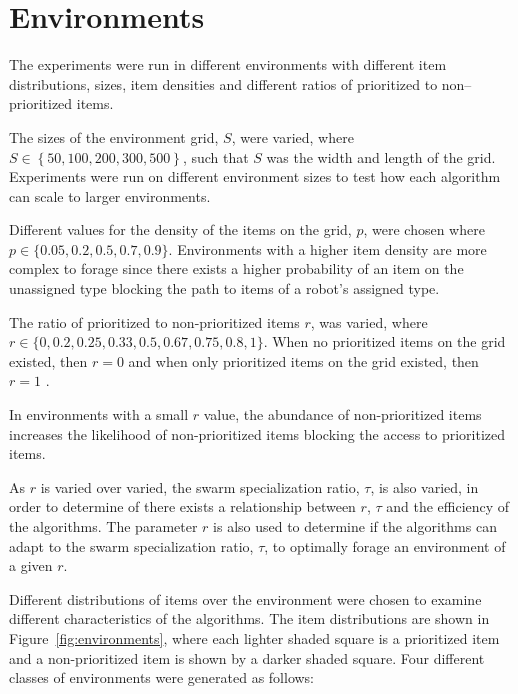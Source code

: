 \section{Environments}
\label{experimentenvironments}

The experiments were run in different environments with different item distributions, sizes, item densities and different ratios of prioritized to non--prioritized items. 

The sizes of the environment grid, $S$, were varied, where $S\in \left\{ 50, 100, 200, 300, 500\right\}$, such that $S$ was the width and length of the grid.  Experiments were run on different environment sizes to test how each algorithm can scale to larger environments.

Different values for the density of the items on the grid, $p$, were chosen where $p\in \{ 0.05,\allowbreak 0.2,\allowbreak 0.5,\allowbreak 0.7,\allowbreak 0.9\}$. Environments with a higher item density are more complex to forage since there exists a higher probability of an item on the unassigned type blocking the path to items of a robot's assigned type.

The ratio of prioritized to non-prioritized items $r$, was varied, where $r\in \{0,\allowbreak 0.2,\allowbreak 0.25,\allowbreak 0.33,\allowbreak 0.5,\allowbreak 0.67,\allowbreak 0.75,\allowbreak 0.8, 1\}$. When no prioritized items on the grid existed, then $r=0$ and when only prioritized items on the grid existed, then $r=1$ .

In environments with a small $r$ value, the abundance of non-prioritized items increases the likelihood of non-prioritized items blocking the access to prioritized items. 

As $r$ is varied over varied, the swarm specialization ratio, $\tau$, is also varied, in order to determine of there exists a relationship between $r$, $\tau$ and the efficiency of the algorithms. The parameter $r$ is also used to determine if the algorithms can adapt to the swarm specialization ratio, $\tau$, to optimally forage an environment of a given $r$. 

Different distributions of items over the environment were chosen to examine different characteristics of the algorithms. The item distributions are shown in Figure~\ref{fig:environments}, where each lighter shaded square is a prioritized item and a non-prioritized item is shown by a darker shaded square. Four different classes of environments were generated as follows:

